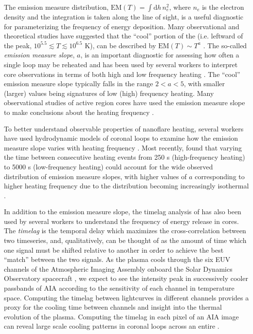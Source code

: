 The emission measure distribution, $\mathrm{EM}(T)=\int\mathrm{d}h\,n_e^2$, where $n_e$ is the electron density and the integration is taken along the line of sight, is a useful diagnostic for parameterizing the frequency of energy deposition. Many observational and theoretical studies have suggested that the ``cool'' portion of the \dem{} (i.e. leftward of the peak, $10^{5.5}\lesssim T\lesssim10^{6.5}$ K), can be described by $\mathrm{EM}(T)\sim T^a$ \citep{jordan_structure_1976,cargill_implications_1994,cargill_nanoflare_2004}. The so-called \textit{emission measure slope}, $a$, is an important diagnostic for assessing how often a single loop may be reheated and has been used by several workers to interpret \AR{} core observations in terms of both high and low frequency heating \citep[see Table 3 of][and references therein]{bradshaw_diagnosing_2012}. The ``cool'' emission measure slope typically falls in the range $2<a<5$, with smaller (larger) values being signatures of low (high) frequency heating. Many observational studies of active region cores have used the emission measure slope to make conclusions about the heating frequency \citep[e.g.][]{tripathi_emission_2011,warren_constraints_2011,winebarger_using_2011,schmelz_cold_2012,warren_systematic_2012,del_zanna_evolution_2015}.

To better understand observable properties of nanoflare heating, several workers have used hydrodynamic models of coronal loops to examine how the emission measure slope varies with heating frequency \citep{mulu-moore_can_2011,bradshaw_diagnosing_2012,reep_diagnosing_2013}. Most recently, \citet{cargill_active_2014} found that varying the time between consecutive heating events from 250 s (high-frequency heating) to 5000 s (low-frequency heating) could account for the wide observed distribution of emission measure slopes, with higher values of $a$ corresponding to higher heating frequency due to the \dem{} distribution becoming increasingly isothermal \citep[see also][]{barnes_inference_2016-1}.

In addition to the emission measure slope, the timelag analysis of \citet{viall_evidence_2012} has also been used by several workers to understand the frequency of energy release in \AR{} cores. The \textit{timelag} is the temporal delay which maximizes the cross-correlation between two timeseries, and, qualitatively, can be thought of as the amount of time which one signal must be shifted relative to another in order to achieve the best ``match'' between the two signals. As the plasma cools through the six EUV channels of the Atmospheric Imaging Assembly \citep[AIA,][]{lemen_atmospheric_2012} onboard the Solar Dynamics Observatory spacecraft \citep[SDO,][]{pesnell_solar_2012}, we expect to see the intensity peak in successively cooler passbands of AIA according to the sensitivity of each channel in temperature space. Computing the timelag between lightcurves in different channels provides a proxy for the cooling time between channels and insight into the thermal evolution of the plasma. Computing the timelag in each pixel of an AIA image can reveal large scale cooling patterns in coronal loops across an entire \AR{}.

